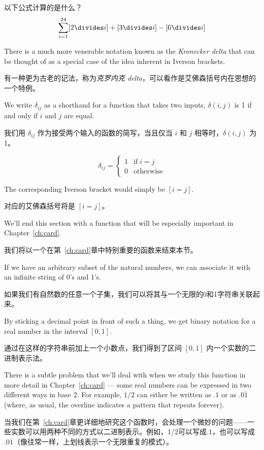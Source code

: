 \begin{exer}
以下公式计算的是什么？
\[ \sum_{i=1}^{24} [2 \divides i] + [3 \divides i] - [6 \divides i] \]
\end{exer}

There is a much more venerable notation known as the 
\emph{Kronecker delta} that can be thought of as a special case of the 
idea inherent in Iverson brackets.

有一种更为古老的记法，称为\emph{克罗内克 delta}，可以看作是艾佛森括号内在思想的一个特例。

We write $\delta_{ij}$ as a shorthand
for a function that takes two inputs, $\delta(i,j)$ is 1 if and only if
$i$ and $j$ are equal.

我们用 $\delta_{ij}$ 作为接受两个输入的函数的简写，当且仅当 $i$ 和 $j$ 相等时，$\delta(i,j)$ 为 1。

\[ \delta_{ij} =  \left\{ \begin{array}{cl} 1 & \mbox{if} \; i=j \\ 0 & \mbox{otherwise} \end{array} \right. \]

The corresponding Iverson bracket would simply be $[i=j]$.

对应的艾佛森括号将是 $[i=j]$。

We'll end this section with a function that will be especially important
in Chapter~\ref{ch:card}.

我们将以一个在第~\ref{ch:card}章中特别重要的函数来结束本节。

If we have an arbitrary subset of the natural
numbers, we can associate it with an infinite string of 0's and 1's.

如果我们有自然数的任意一个子集，我们可以将其与一个无限的0和1字符串关联起来。

By
sticking a decimal point in front of such a thing, we get binary notation
for a real number in the interval $[0,1]$.

通过在这样的字符串前加上一个小数点，我们得到了区间 $[0,1]$ 内一个实数的二进制表示法。

There is a subtle problem that 
we'll deal with when we study this function in more detail in Chapter~\ref{ch:card} --- some real numbers can be expressed in two different ways in base 2.
For example, $1/2$ can either be written as $.1$ or as $.0\overline{1}$ (where,
as usual, the overline indicates a pattern that repeats forever).

当我们在第~\ref{ch:card}章更详细地研究这个函数时，会处理一个微妙的问题——一些实数可以用两种不同的方式以二进制表示。例如，1/2可以写成$.1$，也可以写成$.0\overline{1}$（像往常一样，上划线表示一个无限重复的模式）。

